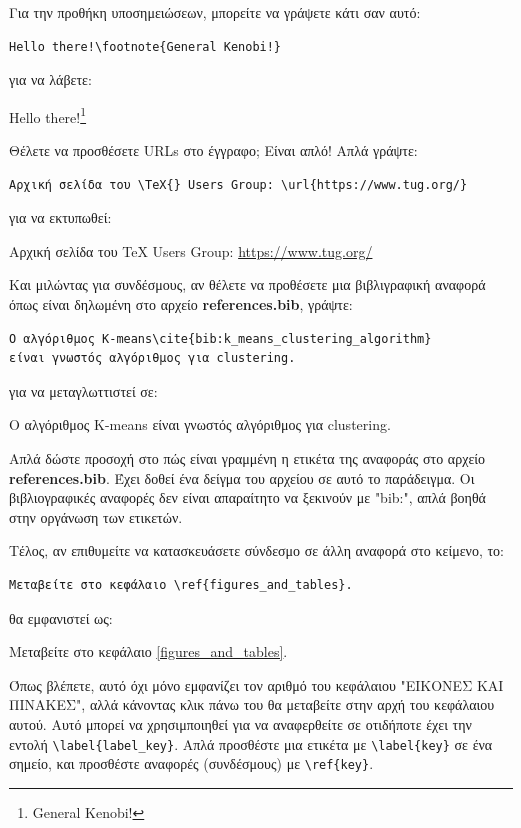 \documentclass[inscr,ack,preface]{dimscthesis}
\begin{document}
Για την προθήκη υποσημειώσεων, μπορείτε να γράψετε κάτι σαν αυτό:

\begin{verbatim}
Hello there!\footnote{General Kenobi!}
\end{verbatim}

για να λάβετε:

Hello there!\footnote{General Kenobi!}

Θέλετε να προσθέσετε URLs στο έγγραφο; Είναι απλό! Απλά γράψτε:

\begin{verbatim}
Αρχική σελίδα του \TeX{} Users Group: \url{https://www.tug.org/}
\end{verbatim}

για να εκτυπωθεί:

Αρχική σελίδα του \TeX{} Users Group: \url{https://www.tug.org/}

Και μιλώντας για συνδέσμους, αν θέλετε να προθέσετε μια βιβλιγραφική αναφορά όπως είναι δηλωμένη στο αρχείο \textbf{references.bib}, γράψτε:

\begin{verbatim}
Ο αλγόριθμος K-means\cite{bib:k_means_clustering_algorithm}
είναι γνωστός αλγόριθμος για clustering.
\end{verbatim}

για να μεταγλωττιστεί σε:

Ο αλγόριθμος K-means\cite{bib:k_means_clustering_algorithm}
είναι γνωστός αλγόριθμος για clustering.

Απλά δώστε προσοχή στο πώς είναι γραμμένη η ετικέτα της αναφοράς στο αρχείο \textbf{references.bib}.
Έχει δοθεί ένα δείγμα του αρχείου σε αυτό το παράδειγμα.
Οι βιβλιογραφικές αναφορές δεν είναι απαραίτητο να ξεκινούν με "bib:", απλά βοηθά στην οργάνωση των ετικετών.

Τέλος, αν επιθυμείτε να κατασκευάσετε σύνδεσμο σε άλλη αναφορά στο κείμενο, το:
\begin{verbatim}
Μεταβείτε στο κεφάλαιο \ref{figures_and_tables}.
\end{verbatim}

θα εμφανιστεί ως:

Μεταβείτε στο κεφάλαιο \ref{figures_and_tables}.

Όπως βλέπετε, αυτό όχι μόνο εμφανίζει τον αριθμό του κεφάλαιου "ΕΙΚΟΝΕΣ ΚΑΙ ΠΙΝΑΚΕΣ", αλλά κάνοντας κλικ πάνω του θα μεταβείτε στην αρχή του κεφάλαιου αυτού.
Αυτό μπορεί να χρησιμποιηθεί για να αναφερθείτε σε οτιδήποτε έχει την εντολή \verb|\label{label_key}|.
Απλά προσθέστε μια ετικέτα με \verb|\label{key}| σε ένα σημείο, και προσθέστε αναφορές (συνδέσμους) με \verb|\ref{key}|.
\end{document}
